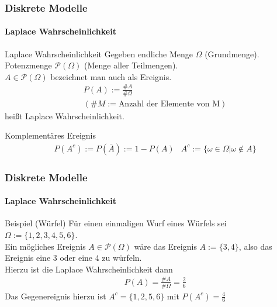 \documentclass{beamer}
\begin{document}
\begin{frame}
    \frametitle{Diskrete Modelle}
\framesubtitle{ Laplace Wahrscheinlichkeit}

\begin{block}{Laplace Wahrscheinlichkeit}
Gegeben endliche Menge $\Omega$ (Grundmenge). \\
Potenzmenge  $\mathcal{P}(\Omega)$   (Menge aller Teilmengen).  \\
$A \in \mathcal{P}(\Omega)$ bezeichnet man auch als Ereignis. 
\begin{align*}
& P(A) := \frac{ \#A}{ \# \Omega} \\
 & (\#M := \text{Anzahl der Elemente von M})
\end{align*}
heißt Laplace Wahrscheinlichkeit.
\end{block}

\begin{block}{Komplementäres Ereignis}
\begin{align*}
& P(A^c) := P(\bar{A}) := 1 - P(A)
 & A^c := \{ \omega \in \Omega | \omega \notin A \}
\end{align*}
\end{block}


 \end{frame}
 
 \begin{frame}
    \frametitle{Diskrete Modelle}
\framesubtitle{ Laplace Wahrscheinlichkeit}

\begin{block}{Beispiel (Würfel)}
Für einen einmaligen Wurf eines Würfels sei $\Omega := \{1,2,3,4,5,6\}$. \\
Ein mögliches Ereignis $A \in \mathcal{P}(\Omega)$ wäre das Ereignis $A := \{3,4\}$, also das Ereignis eine 3 oder eine 4 zu würfeln.  \\
Hierzu ist die Laplace Wahrscheinlichkeit dann 
\begin{align*}
& P(A) = \frac{ \#A}{ \# \Omega} = \frac{2}{6}
\end{align*}
Das Gegenereignis hierzu ist $A^c = \{1,2,5,6\}$ mit $P(A^c) = \frac{4}{6}$
\end{block}

 \end{frame}
\end{document}
